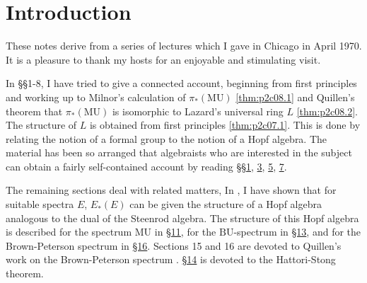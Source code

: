\documentclass[../main]{subfiles}
\begin{document}
\label{sec:p2c0}

\chapter{Introduction}


These notes derive from a series of lectures which I gave in Chicago in April 1970. It is a pleasure to thank my hosts for an enjoyable and stimulating visit.

In \S\S1-8, I have tried to give a connected account, beginning from first principles and working up to Milnor's calculation of $\pi_\ast(\mathrm{MU})$ \eqref{thm:p2c08.1} and Quillen's theorem that $\pi_\ast(\mathrm{MU})$ is isomorphic to Lazard's universal ring $L$ \eqref{thm:p2c08.2}. The structure of $L$ is obtained from first principles \eqref{thm:p2c07.1}. This is done by relating the notion of a formal group to the notion of a Hopf algebra. The material has been so arranged that algebraists who are interested in the subject can obtain a fairly self-contained account by reading \S\S\hyperref[sec:p2c1]{1}, \hyperref[sec:p2c3]{3}, \hyperref[sec:p2c5]{5}, \hyperref[sec:p2c7]{7}.

The remaining sections deal with related matters, In \cite[Lecture 3]{adams3}, I have shown that for suitable spectra $E$, $E_\ast(E)$ can be given the structure of a Hopf algebra analogous to the dual of the Steenrod algebra. The structure of this Hopf algebra is described for the spectrum $\mathrm{MU}$ in \hyperref[sec:p2c11]{\S 11}, for the $\mathrm{BU}$-spectrum in \hyperref[sec:p2c13]{\S 13}, and for the Brown-Peterson spectrum in \hyperref[sec:p2c16]{\S 16}. Sections 15 and 16 are devoted to Quillen's work on the Brown-Peterson spectrum \plscite{[14]}. \hyperref[sec:p2c14]{\S 14} is devoted to the Hattori-Stong theorem. 
\end{document}
